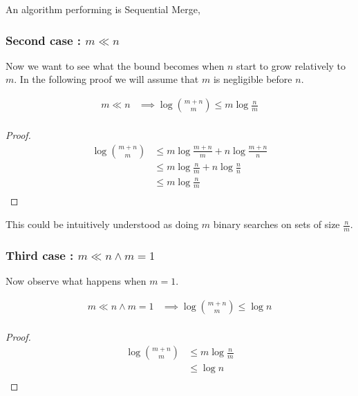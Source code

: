 An algorithm performing  is Sequential Merge, 


\subsubsection{Second case\texorpdfstring{ : $m \ll n$}{}}


Now we want to see what the bound becomes when $n$ start to grow relatively to $m$. In the following proof we will assume that $m$ is negligible before $n$.


\begin{lemma}
\begin{align*}
m \ll n &\implies \log\binom{m+n}{m} \leq m \log\frac{n}{m}\\
\end{align*}
\end{lemma}

\begin{proof}
\begin{align*}
\log\binom{m+n}{m} &\leq m \log\frac{m+n}{m} + n \log\frac{m+n}{n}\\
&\leq m \log\frac{n}{m} + n \log\frac{n}{n}\\
&\leq m \log\frac{n}{m}\\
\end{align*}
\end{proof}


This could be intuitively understood as doing $m$ binary searches on sets of size $\frac{n}{m}$.



\subsubsection{Third case\texorpdfstring{ : $m \ll n \land m = 1$}{}}

Now observe what happens when $m = 1$.

\begin{lemma}
\begin{align*}
m \ll n \land m = 1 &\implies \log\binom{m+n}{m} \leq \log n\\
\end{align*}
\end{lemma}

\begin{proof}
\begin{align*}
\log\binom{m+n}{m} &\leq m \log\frac{n}{m}\\
&\leq \log n\\
\end{align*}
\end{proof}

